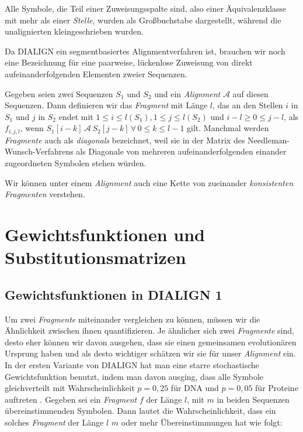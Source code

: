 \begin{beispiel}
	\begin{center}
	\end{center}
Alle Symbole, die Teil einer Zuweisungsspalte sind, also einer Äquivalenzklasse mit mehr als einer \emph{Stelle}, wurden als Großbuchstabe dargestellt, während die unalignierten kleingeschrieben wurden.
\end{beispiel}

Da DIALIGN ein segmentbasiertes Alignmentverfahren ist, brauchen wir noch eine Bezeichnung für eine paarweise, lückenlose Zuweisung von direkt aufeinanderfolgenden Elementen zweier Sequenzen.

\begin{definition}[Fragment]
	Gegeben seien zwei Sequenzen $S_1$ und $S_2$ und ein \emph{Alignment} $\mathcal{A}$ auf diesen Sequenzen. Dann definieren wir das \emph{Fragment} mit Länge $l$, das an den Stellen $i$ in $S_1$ und $j$ in $S_2$ endet mit $1 \leq i \leq l(S_1), 1 \leq j \leq l(S_2)$ und $i - l \geq 0 \leq j - l$, als $f_{i,j,l}$, wenn $S_1[i-k] \, \mathcal{A} \, S_2[j-k] \, \forall \, 0 \leq k \leq l - 1$ gilt. Manchmal werden \emph{Fragmente} auch als \emph{diagonals} bezeichnet, weil sie in der Matrix des Needleman-Wunsch-Verfahrens als Diagonale von mehreren aufeinanderfolgenden einander zugeordneten Symbolen stehen würden.
\end{definition}

Wir können unter einem \emph{Alignment} auch eine Kette von zueinander \emph{konsistenten Fragmenten} verstehen.

\section{Gewichtsfunktionen und Substitutionsmatrizen}
\subsection{Gewichtsfunktionen in DIALIGN 1}

Um zwei \emph{Fragmente} miteinander vergleichen zu können, müssen wir die Ähnlichkeit zwischen ihnen quantifizieren. Je ähnlicher sich zwei \emph{Fragmente} sind, desto eher können wir davon ausgehen, dass sie einen gemeinsamen evolutionären Ursprung haben und als desto wichtiger schätzen wir sie für unser \emph{Alignment} ein. In der ersten Variante von DIALIGN hat man eine starre stochastische Gewichtsfunktion benutzt, indem man davon ausging, dass alle Symbole gleichverteilt mit Wahrscheinlichkeit $p = 0,25$ für DNA und $p = 0,05$ für Proteine auftreten \citep{mdw96}. Gegeben sei ein \emph{Fragment} $f$ der Länge $l$, mit $m$ in beiden Sequenzen übereinstimmenden Symbolen. Dann lautet die Wahrscheinlichkeit, dass ein solches \emph{Fragment} der Länge $l$ $m$ oder mehr Übereinstimmungen hat wie folgt:

